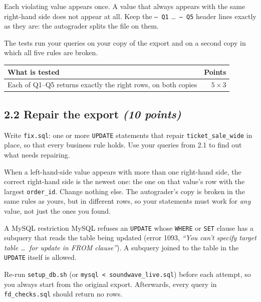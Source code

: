 \documentclass[11pt]{article}
\newcommand{\code}[1]{\texttt{#1}}
\newcommand{\pts}[1]{\hfill\textit{(#1 points)}}
\begin{document}
Each violating value appears once. A value that always appears with the same
right-hand side does not appear at all. Keep the
\code{-- Q1} \ldots\ \code{-- Q5} header lines exactly as they are: the
autograder splits the file on them.

The tests run your queries on your copy of the export and on a second copy in
which all five rules are broken.

\begin{center}
\small
\begin{tabularx}{\linewidth}{@{}X r@{}}
\toprule
\textbf{What is tested} & \textbf{Points}\\
\midrule
Each of Q1--Q5 returns exactly the right rows, on both copies & $5 \times 3$\\
\bottomrule
\end{tabularx}
\end{center}

\subsection*{2.2 Repair the export \pts{10}}

Write \code{fix.sql}: one or more \code{UPDATE} statements that repair
\code{ticket\_sale\_wide} in place, so that every business rule holds. Use
your queries from 2.1 to find out what needs repairing.

When a left-hand-side value appears with more than one right-hand side, the
correct right-hand side is the newest one: the one on that value's row with the
largest \code{order\_id}. Change nothing else. The autograder's copy is broken
in the same rules as yours, but in different rows, so your statements must work
for \emph{any} value, not just the ones you found.

\begin{notebox}{A MySQL restriction}
MySQL refuses an \code{UPDATE} whose \code{WHERE} or \code{SET} clause has a
subquery that reads the table being updated (error 1093, \emph{``You can't
specify target table \ldots\ for update in FROM clause''}). A subquery
joined to the table in the \code{UPDATE} itself is allowed.
\end{notebox}

Re-run \code{setup\_db.sh} (or \code{mysql < soundwave\_live.sql}) before each
attempt, so you always start from the original export. Afterwards, every query
in \code{fd\_checks.sql} should return no rows.
\end{document}
